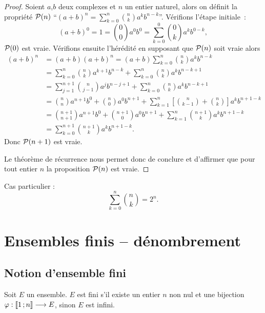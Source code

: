 \begin{proof}
  Soient \(a\),\(b\) deux complexes et \(n\) un entier naturel, alors on 
  définit la propriété \(\P(n)\) ``\((a + b)^n = \sum_{k = 0}^n 
  \binom{n}{k}a^kb^{n - k}\)''. Vérifions l'étape initiale~:
  \begin{equation}
    (a + b)^0 = 1 = \binom{0}{0}a^0b^0 = \sum_{k = 0}^0 \binom{0}{k}a^kb^{0 - k},
  \end{equation}
  \(\P(0)\) est vraie. Vérifions ensuite l'hérédité en supposant que \(\P(n)\) 
  soit vraie alors
  \begin{align}
    (a + b)^n &=(a + b)(a + b)^n = (a + b)\sum_{k = 0}^n \binom{n}{k}a^kb^{n - k}\\
              &=\sum_{k = 0}^n \binom{n}{k}a^{k + 1}b^{n - k}+\sum_{k = 0}^n 
             \binom{n}{k}a^kb^{n - k + 1}\\
              &=\sum_{j = 1}^{n + 1} \binom{n}{j - 1}a^{j}b^{n - j + 1}+\sum_{k = 0}^n 
             \binom{n}{k}a^kb^{n - k + 1}\\
              &=\binom{n}{n}a^{n + 1}b^0 +\binom{n}{0}a^0b^{n + 1} + 
             \sum_{k = 1}^{n}\left[\binom{n}{k - 1}+\binom{n}{k}\right]a^kb^{n + 1 - k}\\
              &=\binom{n + 1}{n + 1}a^{n + 1}b^0 + \binom{n + 1}{0}a^0b^{n + 1}+ 
             \sum_{k = 1}^{n}\binom{n + 1}{k}a^kb^{n + 1 - k}\\
              &=\sum_{k = 0}^{n + 1}\binom{n + 1}{k}a^kb^{n + 1 - k}.
  \end{align}
  Donc \(\P(n + 1)\) est vraie.

  Le théorème de récurrence nous permet donc de conclure et d'affirmer que 
  pour tout entier \(n\) la proposition \(\P(n)\) est vraie.
\end{proof}
Cas particulier :
\begin{equation}
  \sum_{k = 0}^n \binom{n}{k}=2^n.
\end{equation}

\section{Ensembles finis -- dénombrement}

\subsection{Notion d'ensemble fini}

\begin{defdef}
  Soit \(E\) un ensemble. \(E\) est fini s'il existe un entier \(n\) non nul 
  et une bijection \(\fonctionR{\varphi}{\intervalleentier{1}{n}}{E}\), sinon 
  \(E\) est infini.
\end{defdef}

